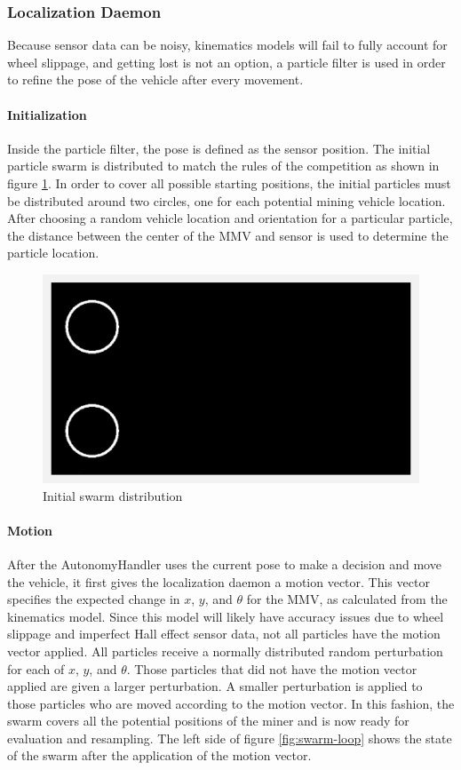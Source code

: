 \subsubsection{Localization Daemon}
Because sensor data can be noisy, kinematics models will fail to fully account for wheel slippage, and getting lost is not an option, a particle filter is used in order to refine the pose of the vehicle after every movement.
\paragraph{Initialization}
Inside the particle filter, the pose is defined as the sensor position.  The initial particle swarm is distributed to match the rules of the competition as shown in figure \ref{fig:swarm-init}.  In order to cover all possible starting positions, the initial particles must be distributed around two circles, one for each potential mining vehicle location.  After choosing a random vehicle location and orientation for a particular particle, the distance between the center of the MMV and sensor is used to determine the particle location.
\begin{figure}[H]
\includegraphics[width=\linewidth]{swarm-init.png}
\caption[Swarm Initialization]{Initial swarm distribution}
\label{fig:swarm-init}
\end{figure}
\paragraph{Motion}
After the AutonomyHandler uses the current pose to make a decision and move the vehicle, it first gives the localization daemon a motion vector.  This vector specifies the expected change in $x$, $y$, and $\theta$ for the MMV, as calculated from the kinematics model.  Since this model will likely have accuracy issues due to wheel slippage and imperfect Hall effect sensor data, not all particles have the motion vector applied.  All particles receive a normally distributed random perturbation for each of $x$, $y$, and $\theta$.  Those particles that did not have the motion vector applied are given a larger perturbation.  A smaller perturbation is applied to those particles who are moved according to the motion vector.  In this fashion, the swarm covers all the potential positions of the miner and is now ready for evaluation and resampling.  The left side of figure \ref{fig:swarm-loop} shows the state of the swarm after the application of the motion vector.
